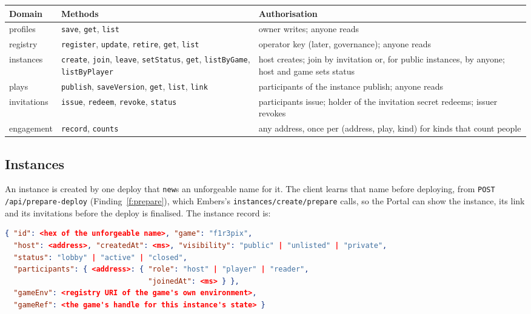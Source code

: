 \documentclass[11pt]{article}
\theoremstyle{definition}
\theoremstyle{remark}
\newcommand{\code}[1]{\texttt{#1}}
\newcommand{\Em}{Embers}
\begin{document}
\begin{longtable}{@{}>{\raggedright\arraybackslash}p{}>{\raggedright\arraybackslash}p{}>{\raggedright\arraybackslash}p{}@{}}
\toprule
Domain & Methods & Authorisation\\
\midrule
\endhead
profiles & \code{save}, \code{get}, \code{list} & owner writes; anyone reads\\
registry & \code{register}, \code{update}, \code{retire}, \code{get}, \code{list}
  & operator key (later, governance); anyone reads\\
instances & \code{create}, \code{join}, \code{leave}, \code{setStatus},
  \code{get}, \code{listByGame}, \code{listByPlayer} & host creates; join by
  invitation or, for public instances, by anyone; host and game sets status\\
plays & \code{publish}, \code{saveVersion}, \code{get}, \code{list},
  \code{link} & participants of the instance publish; anyone reads\\
invitations & \code{issue}, \code{redeem}, \code{revoke}, \code{status}
  & participants issue; holder of the invitation secret redeems; issuer revokes\\
engagement & \code{record}, \code{counts} & any address, once per (address, play,
  kind) for kinds that count people\\
\bottomrule
\end{longtable}

\subsection{Instances}

An instance is created by one deploy that \code{new}s an unforgeable name for it. The
client learns that name before deploying, from \code{POST /api/prepare-deploy}
(Finding~\ref{f:prepare}), which \Em{}'s \code{instances/create/prepare} calls, so
the Portal can show the instance, its link and its invitations before the deploy is
finalised. The instance record is:

\begin{lstlisting}[language=Json]
{ "id": <hex of the unforgeable name>, "game": "f1r3pix",
  "host": <address>, "createdAt": <ms>, "visibility": "public" | "unlisted" | "private",
  "status": "lobby" | "active" | "closed",
  "participants": { <address>: { "role": "host" | "player" | "reader",
                                 "joinedAt": <ms> } },
  "gameEnv": <registry URI of the game's own environment>,
  "gameRef": <the game's handle for this instance's state> }
\end{lstlisting}
\end{document}
